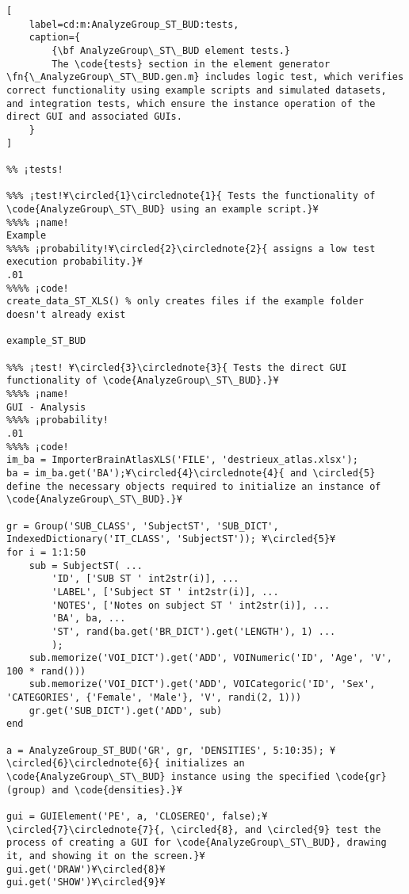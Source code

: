\documentclass{tufte-handout}
\begin{document}
\begin{lstlisting}[
	label=cd:m:AnalyzeGroup_ST_BUD:tests,
	caption={
		{\bf AnalyzeGroup\_ST\_BUD element tests.}
		The \code{tests} section in the element generator \fn{\_AnalyzeGroup\_ST\_BUD.gen.m} includes logic test, which verifies correct functionality using example scripts and simulated datasets, and integration tests, which ensure the instance operation of the direct GUI and associated GUIs.
	}
]	

%% ¡tests!

%%% ¡test!¥\circled{1}\circlednote{1}{ Tests the functionality of \code{AnalyzeGroup\_ST\_BUD} using an example script.}¥
%%%% ¡name!
Example
%%%% ¡probability!¥\circled{2}\circlednote{2}{ assigns a low test execution probability.}¥
.01
%%%% ¡code! 
create_data_ST_XLS() % only creates files if the example folder doesn't already exist

example_ST_BUD

%%% ¡test! ¥\circled{3}\circlednote{3}{ Tests the direct GUI functionality of \code{AnalyzeGroup\_ST\_BUD}.}¥
%%%% ¡name!
GUI - Analysis
%%%% ¡probability!
.01
%%%% ¡code!
im_ba = ImporterBrainAtlasXLS('FILE', 'destrieux_atlas.xlsx');
ba = im_ba.get('BA');¥\circled{4}\circlednote{4}{ and \circled{5} define the necessary objects required to initialize an instance of \code{AnalyzeGroup\_ST\_BUD}.}¥

gr = Group('SUB_CLASS', 'SubjectST', 'SUB_DICT', IndexedDictionary('IT_CLASS', 'SubjectST')); ¥\circled{5}¥
for i = 1:1:50
    sub = SubjectST( ...
        'ID', ['SUB ST ' int2str(i)], ...
        'LABEL', ['Subject ST ' int2str(i)], ...
        'NOTES', ['Notes on subject ST ' int2str(i)], ...
        'BA', ba, ...
        'ST', rand(ba.get('BR_DICT').get('LENGTH'), 1) ...
        );
    sub.memorize('VOI_DICT').get('ADD', VOINumeric('ID', 'Age', 'V', 100 * rand()))
    sub.memorize('VOI_DICT').get('ADD', VOICategoric('ID', 'Sex', 'CATEGORIES', {'Female', 'Male'}, 'V', randi(2, 1)))
    gr.get('SUB_DICT').get('ADD', sub)
end

a = AnalyzeGroup_ST_BUD('GR', gr, 'DENSITIES', 5:10:35); ¥\circled{6}\circlednote{6}{ initializes an \code{AnalyzeGroup\_ST\_BUD} instance using the specified \code{gr} (group) and \code{densities}.}¥

gui = GUIElement('PE', a, 'CLOSEREQ', false);¥\circled{7}\circlednote{7}{, \circled{8}, and \circled{9} test the process of creating a GUI for \code{AnalyzeGroup\_ST\_BUD}, drawing it, and showing it on the screen.}¥
gui.get('DRAW')¥\circled{8}¥
gui.get('SHOW')¥\circled{9}¥


\end{lstlisting}
\end{document}
